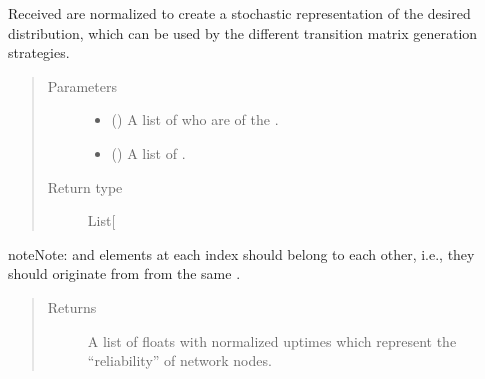 \documentclass[letterpaper,10pt,english]{sphinxmanual}
\begin{document}
\begin{fulllineitems}
\begin{fulllineitems}
Received  are normalized to create a stochastic
representation of the desired distribution, which can be used by the
different transition matrix generation strategies.
\begin{quote}\begin{description}
\item[{Parameters}] \leavevmode\begin{itemize}
\item {} 
 (\sphinxstyleliteralemphasis{\sphinxupquote{{[}}}\sphinxstyleliteralemphasis{\sphinxupquote{{]}}}) \textendash{} A list of {\hyperref[\detokenize{app.domain:app.domain.network_nodes.Node.id}]{}} who are
{\hyperref[\detokenize{app.domain:app.domain.cluster_groups.Cluster.members}]{}} of the .

\item {} 
 (\sphinxstyleliteralemphasis{\sphinxupquote{{[}}}\sphinxstyleliteralemphasis{\sphinxupquote{{]}}}) \textendash{} A list of {\hyperref[\detokenize{app.domain:app.domain.network_nodes.Node.uptime}]{}}.

\end{itemize}

\item[{Return type}] \leavevmode
List{[}\sphinxhref{https://docs.python.org/3.7/library/functions.html\#float}{float}{]}

\end{description}\end{quote}

\begin{sphinxadmonition}{note}{Note:}
 and  elements at each index should
belong to each other, i.e., they should originate from from the
same {\hyperref[\detokenize{app.domain:app.domain.network_nodes.SGNode}]{}}.
\end{sphinxadmonition}
\begin{quote}\begin{description}
\item[{Returns}] \leavevmode
A list of floats with normalized uptimes which represent the
“reliability” of network nodes.


\end{description}
\end{quote}
\end{fulllineitems}
\end{fulllineitems}
\end{document}
